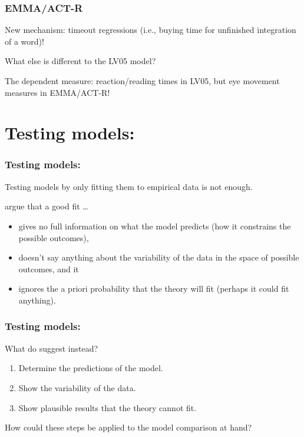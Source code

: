 \documentclass{beamer}
\begin{document}
\begin{frame}
  \frametitle{EMMA/ACT-R \citep{Engelmann2013}}

  New mechanism: timeout regressions (i.e., buying time for unfinished integration of a word)!
  
  What else is different to the LV05 model? 

  The dependent measure: reaction/reading times in LV05, but eye movement measures in EMMA/ACT-R!

\end{frame}

\section{Testing models: \cite{RobertsPashler2000}}

\begin{frame}
  \frametitle{Testing models: \cite{RobertsPashler2000}}

  Testing models by only fitting them to empirical data is not enough.

  \cite{RobertsPashler2000} argue that a good fit \ldots

  \begin{itemize}
    \item gives no full information on what the model predicts (how it constrains the possible outcomes),
    \item doesn't say anything about the variability of the data in the space of possible outcomes, and it
    \item ignores the a priori probability that the theory will fit (perhaps it could fit anything).
  \end{itemize}
\end{frame}

\begin{frame}
  \frametitle{Testing models: \cite{RobertsPashler2000}}

  What do \cite{RobertsPashler2000} suggest instead?

  \begin{enumerate}
    \item Determine the predictions of the model.
    \item Show the variability of the data.
    \item Show plausible results that the theory cannot fit.
  \end{enumerate}

  How could these steps be applied to the model comparison at hand?  

\end{frame}
\end{document}
